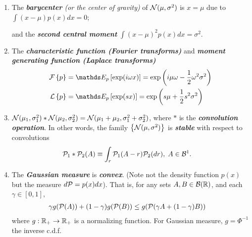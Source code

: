 \documentclass[11pt]{article}
\begin{document}
\begin{itemize}
\begin{remark}
\begin{enumerate}
\item The \emph{\textbf{barycenter} (or the center of gravity)} of ${\mathcal N}(\mu, \sigma^{2})$ is $x=\mu$  due to 
$\int (x-\mu)p(x)dx = 0$;  

and the \emph{\textbf{second central moment}} $\int (x-\mu)^{2}p(x)dx = \sigma^{2}$.

\item The \emph{\textbf{characteristic function (Fourier transforms)}} and \emph{\textbf{moment generating function (Laplace transforms)}}
\begin{align*}
\cF\set{p} &= \E{p}{\exp(i\omega x)} =  \exp\paren{i\mu \omega - \frac{1}{2}\omega^{2}\sigma^{2}}\\
\cL\set{p} &= \E{p}{\exp(s x)} =  \exp\paren{s\mu + \frac{1}{2}s^{2}\sigma^{2}}
\end{align*}

\item ${\mathcal N}(\mu_{1}, \sigma_{1}^{2}) \ast {\mathcal N}(\mu_{2}, \sigma_{2}^{2}) = {\mathcal N}(\mu_{1}+\mu_{2}, \sigma_{1}^{2}+\sigma_{2}^{2})$, where $\ast$ is the \emph{\textbf{convolution operation}}.  In other words, the family $\left\{{\mathcal N}(\mu, \sigma^{2})\right\}$ is \emph{\textbf{stable}} with respect to convolutions
\begin{align*}
{\mathcal P}_{1}\ast {\mathcal P}_{2}(A) &\equiv \int_{r}{\mathcal P}_{1}(A-r){\mathcal P}_{2}(dr), \; A\in {\mathcal B}^{1}.
\end{align*}


\item The \emph{\textbf{Gaussian measure}} is \emph{\textbf{convex}}.  (Note not the density function $p(x)$ but the measure $d{\mathcal P} = p(x) dx$). That is, for any sets $A,B\in {\mathcal B}({\mathbb R})$, and each $\gamma\in [0,1]$, 
\begin{align*}
\gamma g({\mathcal P}(A))+ (1-\gamma)g({\mathcal P}(B)) &\le g({\mathcal P}(\gamma A+ (1-\gamma)B))
\end{align*}
where $g: {\mathbb R}_{+} \rightarrow {\mathbb R}_{+}$ is a normalizing function. For Gaussian measure, $g= \Phi^{-1}$ the inverse c.d.f.
\end{enumerate}
\end{remark}
\end{itemize}
\end{document}
